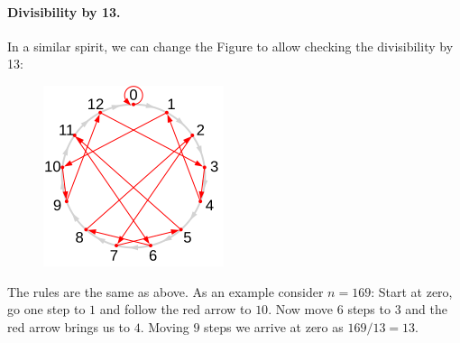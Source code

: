 \paragraph{Divisibility by 13.} In a similar spirit, we can change the Figure to allow checking the divisibility by 13:

\begin{figure}[H]
	\includegraphics[scale=1.5]{images/divisibility_13.png}
\end{figure}

The rules are the same as above. As an example consider $n=169$: Start at zero, go one step to $1$ and follow the red arrow to $10$. Now move $6$ steps to $3$ and the red arrow brings us to $4$. Moving $9$ steps we arrive at zero as $169 / 13 = 13$.